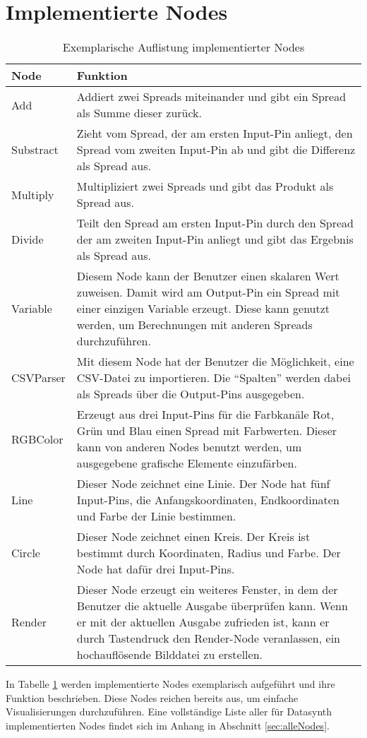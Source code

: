 \documentclass[a4paper, 
               12pt,
               DIV=calc,
               version=first,
               pdftex,
               headsepline,
               footsepline,
               bibliography=totocnumbered,
               listof=numbered]{scrreprt}
\begin{document}
\section{Implementierte Nodes}
\label{sec:ImplementierteNodes}
\begin{table}
\centering
\begin{tabular}{|l|p{10cm}|}
\hline
\textbf{Node} & \textbf{Funktion}\\
\hline
Add & Addiert zwei Spreads miteinander und gibt ein Spread als Summe dieser zurück.\\
\hline
Substract & Zieht vom Spread, der am ersten Input-Pin anliegt, den Spread vom zweiten Input-Pin ab und gibt die Differenz als Spread aus.\\
\hline
Multiply & Multipliziert zwei Spreads und gibt das Produkt als Spread aus.\\
\hline
Divide & Teilt den Spread am ersten Input-Pin durch den Spread der am zweiten Input-Pin anliegt und gibt das Ergebnis als Spread aus.\\
\hline
Variable & Diesem Node kann der Benutzer einen skalaren Wert zuweisen. Damit wird am Output-Pin ein Spread mit einer einzigen
Variable erzeugt. Diese kann genutzt werden, um Berechnungen mit anderen Spreads durchzuführen.\\
\hline
CSVParser & Mit diesem Node hat der Benutzer die Möglichkeit, eine CSV-Datei zu importieren.
Die "`Spalten"' werden dabei als Spreads über die Output-Pins ausgegeben.\\
\hline
RGBColor & Erzeugt aus drei Input-Pins für die Farbkanäle Rot, Grün und Blau einen Spread mit Farbwerten. Dieser
kann von anderen Nodes benutzt werden, um ausgegebene grafische Elemente einzufärben.\\
\hline
Line & Dieser Node zeichnet eine Linie. Der Node hat fünf Input-Pins, die Anfangskoordinaten, Endkoordinaten und Farbe
der Linie bestimmen.\\
\hline
Circle & Dieser Node zeichnet einen Kreis. Der Kreis ist bestimmt durch Koordinaten, Radius und Farbe. Der Node
hat dafür drei Input-Pins.\\
\hline
Render & Dieser Node erzeugt ein weiteres Fenster, in dem der Benutzer die aktuelle Ausgabe überprüfen kann.
Wenn er mit der aktuellen Ausgabe zufrieden ist, kann er durch Tastendruck den Render-Node veranlassen, ein
hochauflösende Bilddatei zu erstellen.\\
\hline
\end{tabular}
\caption{Exemplarische Auflistung implementierter Nodes}
\label{tab:nodes}
\end{table}
In Tabelle \ref{tab:nodes} werden implementierte Nodes exemplarisch aufgeführt und ihre Funktion beschrieben.
Diese Nodes reichen bereits aus, um einfache Visualisierungen durchzuführen. Eine vollständige Liste aller
für Datasynth implementierten Nodes findet sich im Anhang in Abschnitt \ref{sec:alleNodes}.
\end{document}
